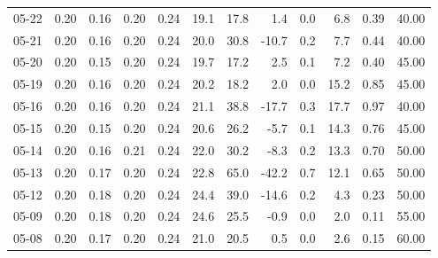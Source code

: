 \begin{threeparttable}
{\begin{tabular}{lrrrrrrrrrrr}
  05-22 &          0.20 &          0.16 &          0.20 &        0.24 &                19.1 &                17.8 &        1.4 &                 0.0 &              6.8 &            0.39 &                  40.00 \\
  05-21 &          0.20 &          0.16 &          0.20 &        0.24 &                20.0 &                30.8 &      -10.7 &                 0.2 &              7.7 &            0.44 &                  40.00 \\
  05-20 &          0.20 &          0.15 &          0.20 &        0.24 &                19.7 &                17.2 &        2.5 &                 0.1 &              7.2 &            0.40 &                  45.00 \\
  05-19 &          0.20 &          0.16 &          0.20 &        0.24 &                20.2 &                18.2 &        2.0 &                 0.0 &             15.2 &            0.85 &                  45.00 \\
  05-16 &          0.20 &          0.16 &          0.20 &        0.24 &                21.1 &                38.8 &      -17.7 &                 0.3 &             17.7 &            0.97 &                  40.00 \\
  05-15 &          0.20 &          0.15 &          0.20 &        0.24 &                20.6 &                26.2 &       -5.7 &                 0.1 &             14.3 &            0.76 &                  45.00 \\
  05-14 &          0.20 &          0.16 &          0.21 &        0.24 &                22.0 &                30.2 &       -8.3 &                 0.2 &             13.3 &            0.70 &                  50.00 \\
  05-13 &          0.20 &          0.17 &          0.20 &        0.24 &                22.8 &                65.0 &      -42.2 &                 0.7 &             12.1 &            0.65 &                  50.00 \\
  05-12 &          0.20 &          0.18 &          0.20 &        0.24 &                24.4 &                39.0 &      -14.6 &                 0.2 &              4.3 &            0.23 &                  50.00 \\
  05-09 &          0.20 &          0.18 &          0.20 &        0.24 &                24.6 &                25.5 &       -0.9 &                 0.0 &              2.0 &            0.11 &                  55.00 \\
  05-08 &          0.20 &          0.17 &          0.20 &        0.24 &                21.0 &                20.5 &        0.5 &                 0.0 &              2.6 &            0.15 &                  60.00 \\

\end{tabular}}
\end{threeparttable}
